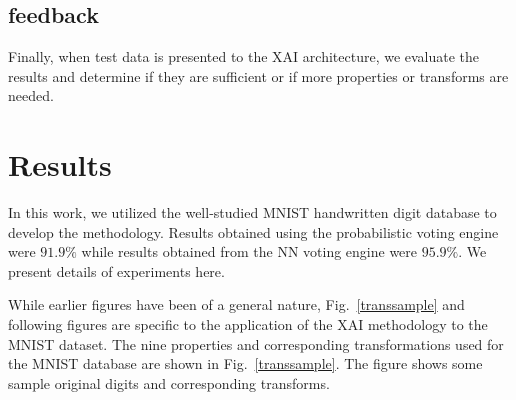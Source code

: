 \documentclass[conference]{IEEEtran}
\begin{document}
\subsection{feedback}
Finally, when test data is presented to the XAI architecture, we evaluate the results and determine if they are sufficient or if more properties or transforms are needed.

\section{Results}

In this work, we utilized the well-studied  MNIST handwritten digit database to develop the methodology.  Results obtained using the probabilistic voting engine were $91.9\%$ while results obtained from the NN voting engine were $95.9\%$.  We present details of experiments here.

While earlier figures have been of a general nature, Fig.~\ref{transsample} and following figures are specific to the application of the XAI methodology to the MNIST dataset.   The nine properties and corresponding transformations used for the MNIST database are shown in Fig.~\ref{transsample}.  The figure shows some sample original digits and corresponding transforms.
\end{document}
